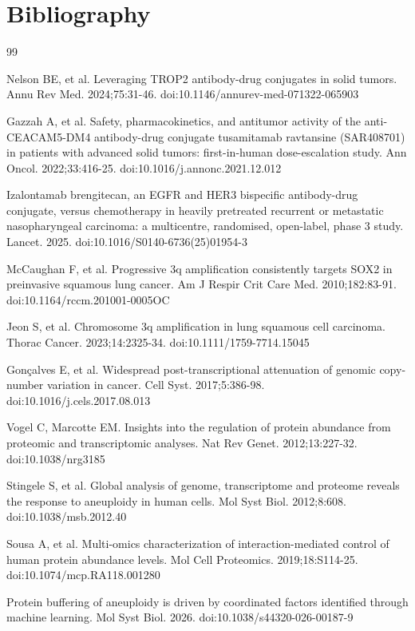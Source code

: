 \documentclass[times, twoside]{zHenriquesLab-StyleBioRxiv}
\begin{document}
\section*{Bibliography}
\begin{thebibliography}{99}

 Nelson BE, et al. Leveraging TROP2 antibody-drug conjugates in solid tumors. Annu Rev Med. 2024;75:31-46. doi:10.1146/annurev-med-071322-065903

 Gazzah A, et al. Safety, pharmacokinetics, and antitumor activity of the anti-CEACAM5-DM4 antibody-drug conjugate tusamitamab ravtansine (SAR408701) in patients with advanced solid tumors: first-in-human dose-escalation study. Ann Oncol. 2022;33:416-25. doi:10.1016/j.annonc.2021.12.012

 Izalontamab brengitecan, an EGFR and HER3 bispecific antibody-drug conjugate, versus chemotherapy in heavily pretreated recurrent or metastatic nasopharyngeal carcinoma: a multicentre, randomised, open-label, phase 3 study. Lancet. 2025. doi:10.1016/S0140-6736(25)01954-3

 McCaughan F, et al. Progressive 3q amplification consistently targets SOX2 in preinvasive squamous lung cancer. Am J Respir Crit Care Med. 2010;182:83-91. doi:10.1164/rccm.201001-0005OC

 Jeon S, et al. Chromosome 3q amplification in lung squamous cell carcinoma. Thorac Cancer. 2023;14:2325-34. doi:10.1111/1759-7714.15045

 Gon\c{c}alves E, et al. Widespread post-transcriptional attenuation of genomic copy-number variation in cancer. Cell Syst. 2017;5:386-98. doi:10.1016/j.cels.2017.08.013

 Vogel C, Marcotte EM. Insights into the regulation of protein abundance from proteomic and transcriptomic analyses. Nat Rev Genet. 2012;13:227-32. doi:10.1038/nrg3185

 Stingele S, et al. Global analysis of genome, transcriptome and proteome reveals the response to aneuploidy in human cells. Mol Syst Biol. 2012;8:608. doi:10.1038/msb.2012.40

 Sousa A, et al. Multi-omics characterization of interaction-mediated control of human protein abundance levels. Mol Cell Proteomics. 2019;18:S114-25. doi:10.1074/mcp.RA118.001280

 Protein buffering of aneuploidy is driven by coordinated factors identified through machine learning. Mol Syst Biol. 2026. doi:10.1038/s44320-026-00187-9


\end{thebibliography}
\end{document}
